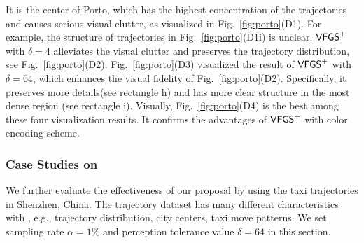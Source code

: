  It is the center of Porto, which has the highest concentration of the trajectories and causes serious visual clutter, as visualized in Fig.~\ref{fig:porto}(D1).
For example, the structure of trajectories in Fig.~\ref{fig:porto}(D1i) is unclear.
$\mathsf{VFGS}^{+}$ with $\delta=4$ alleviates the visual clutter and preserves the trajectory distribution, see Fig.~\ref{fig:porto}(D2).
Fig.~\ref{fig:porto}(D3) visualized the result of $\mathsf{VFGS}^{+}$ with $\delta=64$, which enhances the visual fidelity of Fig.~\ref{fig:porto}(D2).
Specifically, it preserves more details(see rectangle h) and has more clear structure in the most dense region (see rectangle i).
Visually, Fig.~\ref{fig:porto}(D4) is the best among these four visualization results.
It confirms the advantages of $\mathsf{VFGS}^{+}$ with color encoding scheme.





\subsubsection{Case Studies on \sz}\label{sec:sz}
We further evaluate the effectiveness of our proposal by using the taxi trajectories in Shenzhen, China.
The \sz{} trajectory dataset has many different characteristics with \pt{}, e.g., trajectory distribution, city centers, taxi move patterns.
We set sampling rate $\alpha=1\%$ and perception tolerance value $\delta = 64$ in this section.

